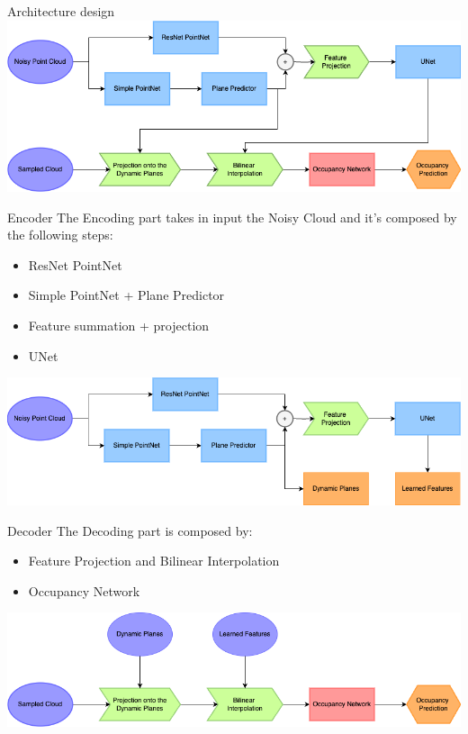 \documentclass{beamer}
\begin{document}
\begin{frame}{Architecture design}
\includegraphics[width=\textwidth]{../media/structure/pipeline_chiaro.png}
\end{frame}

\begin{frame}{Encoder}
The Encoding part takes in input the Noisy Cloud and it's composed by the following steps:
  \begin{itemize}
    \item ResNet PointNet
    \item Simple PointNet + Plane Predictor 
    \item Feature summation + projection 
    \item UNet
  \end{itemize}
\includegraphics[width=\textwidth]{../media/structure/encoder_pipeline.png}
\end{frame}

\begin{frame}{Decoder}
The Decoding part is composed by:
\begin{itemize}
\item Feature Projection and Bilinear Interpolation
\item Occupancy Network
\end{itemize}
\includegraphics[width=\textwidth]{../media/structure/decoder_pipeline.png}
\end{frame}
\end{document}
